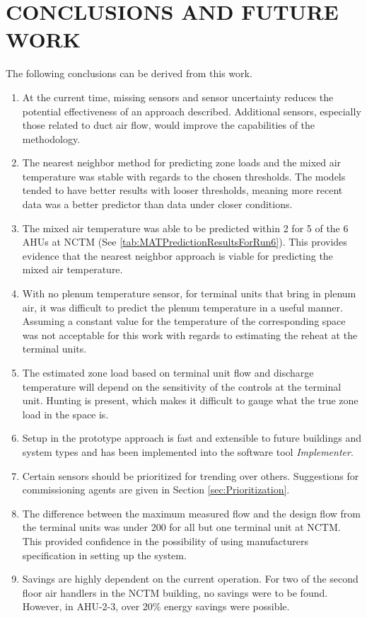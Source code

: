 \chapter{\texorpdfstring{\MakeUppercase{Conclusions and Future Work}}{Conclusions and Future Work}}

The following conclusions can be derived from this work.

\begin{enumerate}
    \item At the current time, missing sensors and sensor uncertainty
        reduces the potential effectiveness of an approach described.
        Additional sensors, especially those related to duct air flow,
        would improve the capabilities of the methodology.
    \item The nearest neighbor method for predicting zone loads and the
        mixed air temperature was stable with regards to the chosen
        thresholds. The models tended to have better results with looser
        thresholds, meaning more recent data was a better predictor than
        data under closer conditions.
    \item The mixed air temperature was able to be predicted within
        \SI{2}{\degF} for 5 of the 6 AHUs at NCTM (See \tableref{}
        \ref{tab:MATPredictionResultsForRun6}). This provides evidence
        that the nearest neighbor approach is viable for predicting the
        mixed air temperature.
    \item With no plenum temperature sensor, for terminal units that
        bring in plenum air, it was difficult to predict the plenum
        temperature in a useful manner. Assuming a constant value for the
        temperature of the corresponding space was not acceptable for
        this work with regards to estimating the reheat at the terminal units.
    \item The estimated zone load based on terminal unit flow and
        discharge temperature will depend on the sensitivity of the
        controls at the terminal unit. Hunting is present, which makes
        it difficult to gauge what the true zone load in the space is.
    \item Setup in the prototype approach is fast and extensible to
        future buildings and system types and has been implemented into
        the software tool \textit{Implementer}.
    \item Certain sensors should be prioritized for trending over
        others. Suggestions for commissioning agents are given in
        Section \ref{sec:Prioritization}.
    \item The difference between the maximum measured flow and the design flow
        from the terminal units was under \SI{200}{\CFM} for all but one
        terminal unit at NCTM. This provided confidence in the
        possibility of using manufacturers specification in setting up
        the system.
    \item Savings are highly dependent on the current operation. For two
        of the second floor air handlers in the NCTM building, no
        savings were to be found. However, in AHU-2-3, over 20\% energy
        savings were possible.
\end{enumerate}

